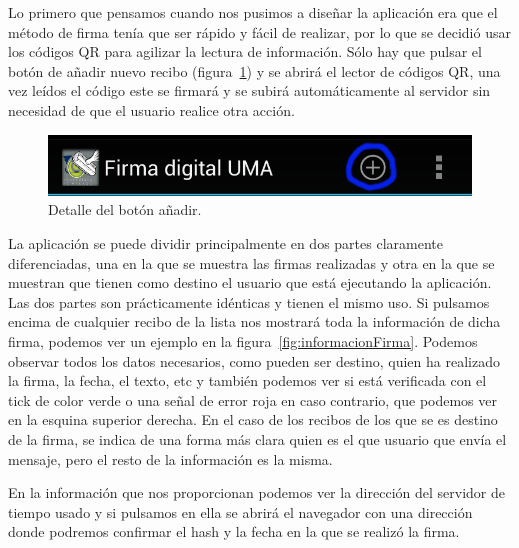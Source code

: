 Lo primero que pensamos cuando nos pusimos a diseñar la aplicación era que el método de firma tenía que ser rápido y fácil de realizar, por lo que se decidió usar los códigos QR para agilizar la lectura de información. Sólo hay que pulsar el botón de añadir nuevo recibo (figura~\ref{fig:botonAnhadir}) y se abrirá el lector de códigos QR, una vez leídos el código este se firmará y se subirá automáticamente al servidor sin necesidad de que el usuario realice otra acción.

\begin{figure}[h]
  \centering
    \includegraphics[scale=0.2]{./Android/imagenes/botonAnhadir.png}
  \caption{Detalle del botón añadir.}
  \label{fig:botonAnhadir}
\end{figure}

La aplicación se puede dividir principalmente en dos partes claramente diferenciadas, una en la que se muestra las firmas realizadas y otra en la que se muestran que tienen como destino el usuario que está ejecutando la aplicación. Las dos partes son prácticamente idénticas y tienen el mismo uso. Si pulsamos encima de cualquier recibo de la lista nos mostrará toda la información de dicha firma, podemos ver un ejemplo en la figura~\ref{fig:informacionFirma}. Podemos observar todos los datos necesarios, como pueden ser destino, quien ha realizado la firma, la fecha, el texto, etc y también podemos ver si está verificada con el tick de color verde o una señal de error roja en caso contrario, que podemos ver en la esquina superior derecha. En el caso de los recibos de los que se es destino de la firma, se indica de una forma más clara quien es el que usuario que envía el mensaje, pero el resto de la información es la misma.

En la información que nos proporcionan podemos ver la dirección del servidor de tiempo usado y si pulsamos en ella se abrirá el navegador con una dirección donde podremos confirmar el hash y la fecha en la que se realizó la firma.

